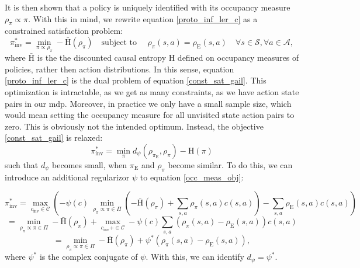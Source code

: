 It is then shown that a policy is uniquely identified with its occupancy measure $\rho_{\pi} \propto \pi$. With this in mind, we rewrite equation \ref{proto_inf_ler_c} as a constrained satisfaction problem:
\begin{equation}
    \label{const_sat_gail}
    \pi_{\text{inv}}^* = \min_{\pi \propto \rho_{\pi}} - \bar{\text{H}}(\rho_{\pi})\quad \text{subject to }\quad \rho_{\pi}(s,a) = \rho_{\text{E}}(s,a) \quad \forall s \in \mathcal{S}, \forall a \in \mathcal{A},
\end{equation}
where $\bar{\text{H}}$ is the the discounted causal entropy $\text{H}$ defined on occupancy measures of policies, rather then action distributions. In this sense, equation \ref{proto_inf_ler_c} is the dual problem of equation \ref{const_sat_gail}. 
This optimization is intractable, as we get as many constraints, as we have action state pairs in our \ac{mdp}. Moreover, in practice we only have a small sample size, which would mean setting 
the occupancy measure for all unvisited state action pairs to zero. This is obviously not the intended optimum. Instead, the objective \ref{const_sat_gail} is relaxed:
\begin{equation}
    \label{dist_opt}
    \pi_{\text{inv}}^* = \min_{\pi} d_{\psi}(\rho_{\pi_{\text{E}}}, \rho_{\pi}) - \text{H}(\pi)
\end{equation}
such that $d_{\psi}$ becomes small, when $\pi_{\text{E}}$ and $\rho_{\pi}$ become similar. To do this, we can introduce an additional regularizor $\psi$ to equation \ref{occ_meas_obj}:

\begin{equation*}
    \pi_{\text{inv}}^* = \max_{c_{\text{inv}} \in \mathcal{C}} \left(-\psi(c) \ \min_{\rho_\pi \propto \pi \in \Pi} \left(- \bar{\text{H}}(\rho_\pi) + \sum_{s,a} \rho_\pi(s,a) c(s,a) \right) - \sum_{s,a} \rho_{\text{E}}(s,a) c(s,a) \right)
\end{equation*}
\begin{equation*}
    = \min_{\rho_\pi \propto \pi \in \Pi}- \bar{\text{H}}(\rho_\pi) + \max_{c_{\text{inv}} + \in \mathcal{C}} -\psi(c) \sum_{s,a} \left( \rho_\pi(s,a) - \rho_{\text{E}}(s,a)\right) c(s,a)
\end{equation*}
\begin{equation}
    \label{proto_inf_ler_c_reg}
    = \min_{\rho_\pi \propto \pi \in \Pi}- \bar{\text{H}}(\rho_\pi) + \psi^*(\rho_\pi(s,a) - \rho_{\text{E}}(s,a)),
\end{equation}
where $\psi^*$ is the complex conjugate of $\psi$. With this, we can identify $d_{\psi} = \psi^*$.\\

